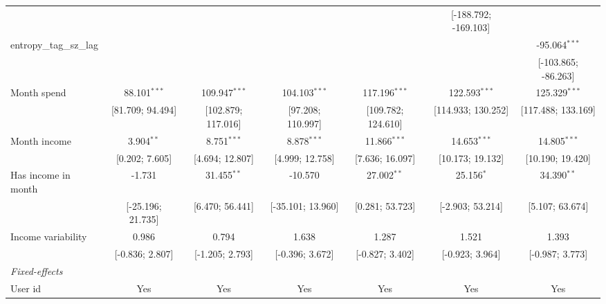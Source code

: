 \begin{table}[htbp]
\begin{threeparttable}[b]
\begin{tabular}{lcccccc}
                                          &                      &                      &                      &                      & [-188.792; -169.103] &   \\   
         entropy\_tag\_sz\_lag            &                      &                      &                      &                      &                      & -95.064$^{***}$\\   
                                          &                      &                      &                      &                      &                      & [-103.865; -86.263]\\   
         Month spend                      & 88.101$^{***}$       & 109.947$^{***}$      & 104.103$^{***}$      & 117.196$^{***}$      & 122.593$^{***}$      & 125.329$^{***}$\\   
                                          & [81.709; 94.494]     & [102.879; 117.016]   & [97.208; 110.997]    & [109.782; 124.610]   & [114.933; 130.252]   & [117.488; 133.169]\\   
         Month income                     & 3.904$^{**}$         & 8.751$^{***}$        & 8.878$^{***}$        & 11.866$^{***}$       & 14.653$^{***}$       & 14.805$^{***}$\\   
                                          & [0.202; 7.605]       & [4.694; 12.807]      & [4.999; 12.758]      & [7.636; 16.097]      & [10.173; 19.132]     & [10.190; 19.420]\\   
         Has income in month              & -1.731               & 31.455$^{**}$        & -10.570              & 27.002$^{**}$        & 25.156$^{*}$         & 34.390$^{**}$\\   
                                          & [-25.196; 21.735]    & [6.470; 56.441]      & [-35.101; 13.960]    & [0.281; 53.723]      & [-2.903; 53.214]     & [5.107; 63.674]\\   
         Income variability               & 0.986                & 0.794                & 1.638                & 1.287                & 1.521                & 1.393\\   
                                          & [-0.836; 2.807]      & [-1.205; 2.793]      & [-0.396; 3.672]      & [-0.827; 3.402]      & [-0.923; 3.964]      & [-0.987; 3.773]\\   
         \midrule
         \emph{Fixed-effects}\\
         User id                          & Yes                  & Yes                  & Yes                  & Yes                  & Yes                  & Yes\\  

\end{tabular}
\end{threeparttable}
\end{table}
